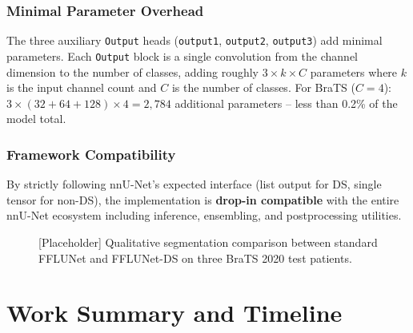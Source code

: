 \documentclass[12pt,a4paper]{report}
\begin{document}
\subsection{Minimal Parameter Overhead}
The three auxiliary \texttt{Output} heads (\texttt{output1}, \texttt{output2}, \texttt{output3}) add minimal parameters. Each \texttt{Output} block is a single convolution from the channel dimension to the number of classes, adding roughly $3 \times k \times C$ parameters where $k$ is the input channel count and $C$ is the number of classes. For BraTS ($C=4$): $3 \times (32 + 64 + 128) \times 4 = 2{,}784$ additional parameters -- less than 0.2\% of the model total.

\subsection{Framework Compatibility}
By strictly following nnU-Net's expected interface (list output for DS, single tensor for non-DS), the implementation is \textbf{drop-in compatible} with the entire nnU-Net ecosystem including inference, ensembling, and postprocessing utilities.

\begin{figure}[H]
\centering
{}
\caption{[Placeholder] Qualitative segmentation comparison between standard FFLUNet and FFLUNet-DS on three BraTS 2020 test patients.}
\label{fig:qual_comparison}
\end{figure}

\chapter{Work Summary and Timeline}
\end{document}
